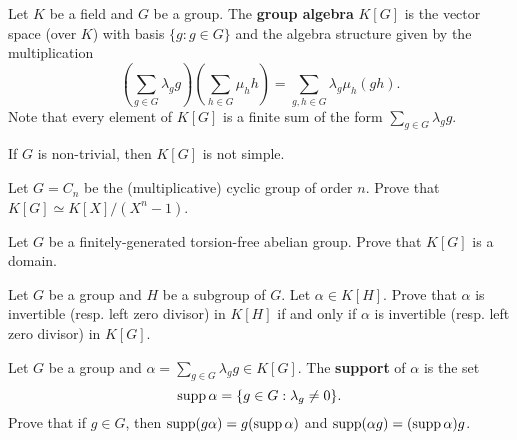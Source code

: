 \chapter{}


Let $K$ be a field and $G$ be a group. The \textbf{group algebra} $K[G]$ 
is the vector space (over $K$) with basis $\{g:g\in G\}$ 
and the algebra structure given by the multiplication
\[
	\left(\sum_{g\in G}\lambda_gg\right)\left(\sum_{h\in G}\mu_hh\right)
	=\sum_{g,h\in G}\lambda_g\mu_h(gh).
\]
Note that every element of $K[G]$ is a finite sum of the form $\sum_{g\in G}\lambda_gg$.

\begin{exercise}
\label{xc:K[G]notsimple}
    If $G$ is non-trivial, then $K[G]$ is not simple. 
\end{exercise}

\begin{exercise}
	Let $G=C_n$ be the (multiplicative) cyclic group of order $n$. Prove that 
	$K[G]\simeq K[X]/(X^n-1)$. 
\end{exercise}

\begin{exercise}
	Let $G$ be a finitely-generated torsion-free abelian group. Prove that 
	$K[G]$ is a domain. 
\end{exercise}

\begin{exercise}
	Let $G$ be a group and $H$ be a subgroup of $G$. Let $\alpha\in K[H]$. Prove that 
    $\alpha$ is invertible (resp. left zero divisor) in $K[H]$ if and only if 
	$\alpha$ is invertible (resp. left zero divisor) in
	$K[G]$.
\end{exercise}

\begin{exercise}
	Let $G$ be a group and $\alpha=\sum_{g\in G}\lambda_gg\in K[G]$.  
	The \textbf{support} of $\alpha$ is the set 
	\[
		\operatorname{supp}\alpha=\{g\in G:\lambda_g\ne 0\}.
	\]
	Prove that if $g\in G$, then 
	$\operatorname{supp}(g\alpha)=g(\operatorname{supp}\alpha)$ and $\operatorname{supp}(\alpha g)=(\operatorname{supp}\alpha)g$.
\end{exercise}


